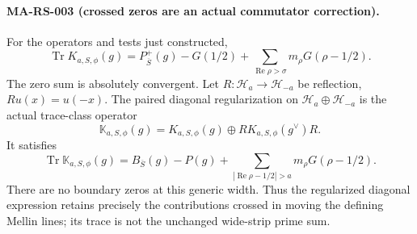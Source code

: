 \paragraph{MA-RS-003 (crossed zeros are an actual commutator correction).}
For the operators and tests just constructed,
\[
 \operatorname{Tr}K_{a,S,\phi}(g)
       =P_{\overline S}^{+}(g)-G(1/2)
                +\sum_{\operatorname{Re}\rho>\sigma}
                             m_\rho G(\rho-1/2).
 \tag{MA-RS.26}
\]
The zero sum is absolutely convergent.
Let $R:\mathcal H_a\to\mathcal H_{-a}$ be reflection,
$Ru(x)=u(-x)$.  The paired diagonal regularization
on $\mathcal H_a\oplus\mathcal H_{-a}$ is the actual
trace-class operator
\[
        \mathbb K_{a,S,\phi}(g)
             =K_{a,S,\phi}(g)\oplus
                       R K_{a,S,\phi}(g^\vee)R .
 \tag{MA-RS.27}
\]
It satisfies
\[
 \boxed{\ 
 \operatorname{Tr}\mathbb K_{a,S,\phi}(g)
    =B_{\overline S}(g)-P(g)
       +\sum_{|\operatorname{Re}\rho-1/2|>a}
                         m_\rho G(\rho-1/2).\ }
 \tag{MA-RS.28}
\]
There are no boundary zeros at this generic width.
Thus the regularized diagonal expression retains precisely
the contributions crossed in moving the defining Mellin
lines; its trace is not the unchanged wide-strip prime sum.

